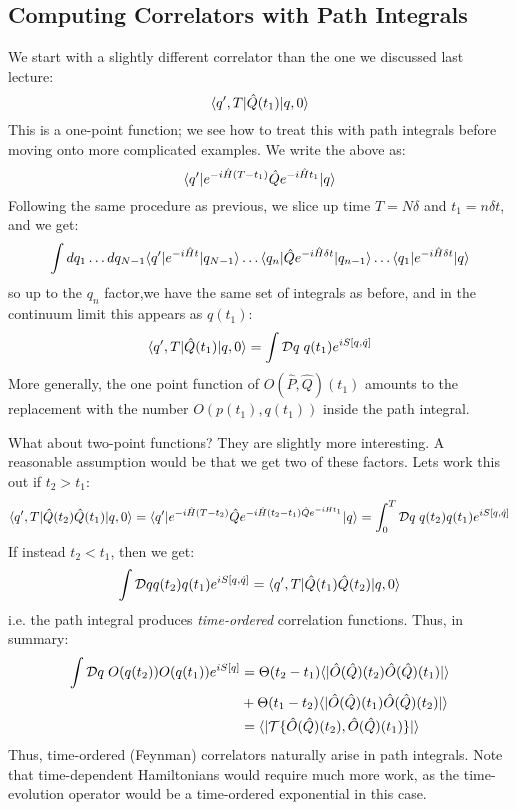 \subsection{Computing Correlators with Path Integrals}
We start with a slightly different correlator than the one we discussed last lecture:
\begin{equation}
    \langle q', T \rvert\hat{Q}(t_1)\lvert q, 0 \rangle
\end{equation}
This is a one-point function; we see how to treat this with path integrals before moving onto more complicated examples. We write the above as:
\begin{equation}
    \langle q' \rvert e^{-i\hat{H}(T-t_1)}\hat{Q}e^{-i\hat{H}t_1}\lvert q \rangle
\end{equation}
Following the same procedure as previous, we slice up time $T = N\delta$ and $t_1 = n\delta t$, and we get:
\begin{equation}
    \int dq_1 \ldots dq_{N-1}\langle q' \rvert e^{-i\hat{H}t}\lvert q_{N-1} \rangle\ldots \langle q_n \rvert\hat{Q}e^{-i\hat{H}\delta t}\lvert q_{n-1} \rangle\ldots \langle q_1 \rvert e^{-i\hat{H}\delta t}\lvert q \rangle
\end{equation}
so up to the $q_n$ factor,we have the same set of integrals as before, and in the continuum limit this appears as $q(t_1)$:
\begin{equation}
    \langle q', T \rvert\hat{Q}(t_1)\lvert q, 0 \rangle = \int \mathcal{D}q\; q(t_1)e^{iS[q, \dot{q}]}
\end{equation}
More generally, the one point function of $O(\hat{P}, \hat{Q})(t_1)$ amounts to the replacement with the number $O(p(t_1), q(t_1))$ inside the path integral.

What about two-point functions? They are slightly more interesting. A reasonable assumption would be that we get two of these factors. Lets work this out if $t_2 > t_1$:
\begin{equation}
    \langle q', T \rvert\hat{Q}(t_2)\hat{Q}(t_1)\lvert q, 0 \rangle = \langle q' \rvert e^{-i\hat{H}(T - t_2)}\hat{Q}e^{-i\hat{H}(t_2 - t_1)\hat{Q}e^{-iH t_1}}\lvert q \rangle = \int_0^T \mathcal{D}q\; q(t_2)q(t_1)e^{iS[q, \dot{q}]}
\end{equation}
If instead $t_2 < t_1$, then we get:
\begin{equation}
    \int \mathcal{D}q q(t_2)q(t_1)e^{iS[q, \dot{q}]} = \langle q', T \rvert\hat{Q}(t_1)\hat{Q}(t_2)\lvert q, 0 \rangle
\end{equation}
i.e. the path integral produces \emph{time-ordered} correlation functions. Thus, in summary:
\begin{equation}
    \begin{split}
        \int \mathcal{D}q\; O(q(t_2))O(q(t_1))e^{iS[q]} 
        &= \Theta(t_2 - t_1)\langle  \rvert\hat{O}(\hat{Q})(t_2) \hat{O}(\hat{Q})(t_1)\lvert  \rangle 
        \\ &+ \Theta(t_1 - t_2)\langle  \rvert\hat{O}(\hat{Q})(t_1) \hat{O}(\hat{Q})(t_2)\lvert  \rangle 
        \\ &= \langle  \rvert\mathcal{T}\{\hat{O}(\hat{Q})(t_2), \hat{O}(\hat{Q})(t_1)\}\lvert  \rangle
    \end{split}
\end{equation}
Thus, time-ordered (Feynman) correlators naturally arise in path integrals. Note that time-dependent Hamiltonians would require much more work, as the time-evolution operator would be a time-ordered exponential in this case.

